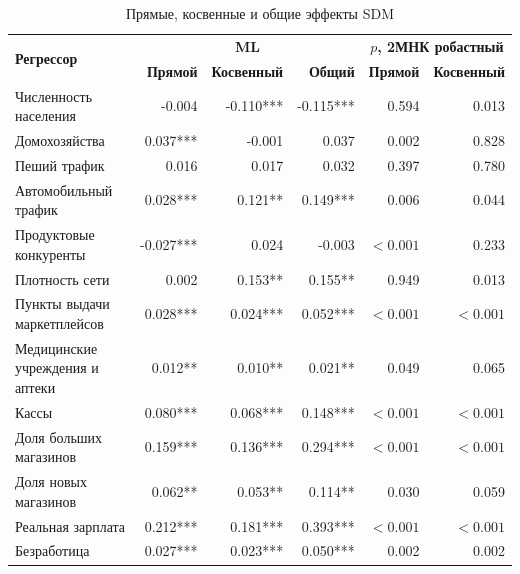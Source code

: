 \documentclass[12pt, a4paper]{article}
\begin{document}
\begin{table}[H]
    \centering
    \footnotesize
    \caption{Прямые, косвенные и общие эффекты SDM}
    \label{tab:impacts}
    \begin{tabular}{lrrrrr}
        \toprule
        \multirow{2}{*}{\textbf{Регрессор}} & \multicolumn{3}{c}{\textbf{ML}} & \multicolumn{2}{c}{\textbf{$p$, 2МНК робастный}} \\
        & \textbf{Прямой} & \textbf{Косвенный} & \textbf{Общий} & \textbf{Прямой} & \textbf{Косвенный} \\
        \midrule
        Численность населения & -0.004 & -0.110*** & -0.115*** & 0.594 & 0.013 \\
        Домохозяйства & 0.037*** & -0.001 & 0.037 & 0.002 & 0.828 \\
        Пеший трафик & 0.016 & 0.017 & 0.032 & 0.397 & 0.780 \\
        Автомобильный трафик & 0.028*** & 0.121** & 0.149*** & 0.006 & 0.044 \\
        Продуктовые конкуренты & -0.027*** & 0.024 & -0.003 & $< 0.001$ & 0.233 \\
        Плотность сети & 0.002 & 0.153** & 0.155** & 0.949 & 0.013 \\
        Пункты выдачи маркетплейсов & 0.028*** & 0.024*** & 0.052*** & $< 0.001$ & $< 0.001$ \\
        Медицинские учреждения и аптеки & 0.012** & 0.010** & 0.021** & 0.049 & 0.065 \\
        Кассы & 0.080*** & 0.068*** & 0.148*** & $< 0.001$ & $< 0.001$ \\
        Доля больших магазинов & 0.159*** & 0.136*** & 0.294*** & $< 0.001$ & $< 0.001$ \\
        Доля новых магазинов & 0.062** & 0.053** & 0.114** & 0.030 & 0.059 \\
        Реальная зарплата & 0.212*** & 0.181*** & 0.393*** & $< 0.001$ & $< 0.001$ \\
        Безработица & 0.027*** & 0.023*** & 0.050*** & 0.002 & 0.002 \\
        \bottomrule
    \end{tabular}
    \par\vspace{1mm}{\footnotesize Примечание: значимость по 2000 симуляциям; *, **, *** - на уровнях 10\%, 5\% и 1\%. Источник: расчеты авторов по данным X5 Group, Росстата и GeoNames.}
\end{table}
\end{document}
